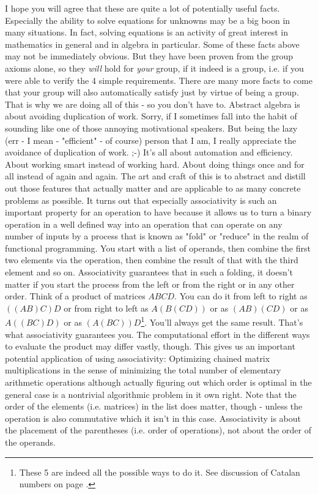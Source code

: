 \medskip
I hope you will agree that these are quite a lot of potentially useful facts. Especially the ability to solve equations for unknowns may be a big boon in many situations. In fact, solving equations is an activity of great interest in mathematics in general and in algebra in particular. Some of these facts above may not be immediately obvious. But they have been proven from the group axioms alone, so they \emph{will} hold for \emph{your} group, if it indeed is a group, i.e. if you were able to verify the 4 simple requirements. There are many more facts to come that your group will also automatically satisfy just by virtue of being a group. That is why we are doing all of this - so you don't have to. Abstract algebra is about avoiding duplication of work. Sorry, if I sometimes fall into the habit of sounding like one of those annoying motivational speakers. But being the lazy (err - I mean - "efficient" - of course) person that I am, I really appreciate the avoidance of duplication of work. ;-) It's all about automation and efficiency. About working smart instead of working hard. About doing things once and for all instead of again and again. The art and craft of this is to abstract and distill out those features that actually matter and are applicable to as many concrete problems as possible. It turns out that especially associativity is such an important property for an operation to have because it allows us to turn a binary operation in a well defined way into an operation that can operate on any number of inputs by a process that is known as "fold" or "reduce" in the realm of functional programming. You start with a list of operands, then combine the first two elements via the operation, then combine the result of that with the third element and so on. Associativity guarantees that in such a folding, it doesn't matter if you start the process from the left or from the right or in any other order. Think of a product of matrices $ABCD$. You can do it from left to right as $((AB)C)D$ or from right to left as $A(B(CD))$ or as $(AB)(CD)$ or as $A((BC)D)$ or as $(A(BC))D$\footnote{These 5 are indeed all the possible ways to do it. See discussion of Catalan numbers on page \pageref{Sec:CatalanNumbers}.}. You'll always get the same result. That's what associativity guarantees you. The computational effort in the different ways to evaluate the product may differ vastly, though. This gives us an important potential application of using associativity: Optimizing chained matrix multiplications in the sense of minimizing the total number of elementary arithmetic operations although actually figuring out which order is optimal in the general case is a nontrivial algorithmic problem in it own right. Note that the order of the elements (i.e. matrices) in the list does matter, though - unless the operation is also commutative which it isn't in this case. Associativity is about the placement of the parentheses (i.e. order of operations), not about the order of the operands.

